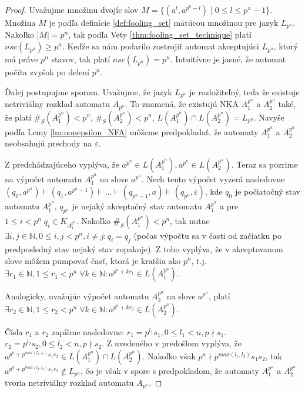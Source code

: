 \begin{proof}
Uvažujme množinu dvojíc slov $ M = \lbrace (a^{l},a^{p^n-l}) \; | \; 0 \leq l \leq p^n-1 \rbrace $. Množina $ M $ je podľa definície \ref{def:fooling_set} mätúcou množinou pre jazyk $ L_{p^n} $. Nakoľko $ |M|=p^n $, tak podľa Vety \ref{thm:fooling_set_technique} platí $ nsc(L_{p^n}) \geq p^n $. Keďže sa nám podarilo zostrojiť automat akceptujúci $ L_{p^n} $, ktorý má práve $ p^n $ stavov, tak platí $ nsc(L_{p^n}) = p^n$. Intuitívne je jasné, že automat počíta zvyšok po delení $ p^n $.
\par
Ďalej postupujme sporom. Uvažujme, že jazyk $ L_{p^n} $ je rozložiteľný, teda že existuje netriviálny rozklad automatu $ A_{p^n} $. To znamená, že existujú NKA $ A_1^{p^n} $ a $ A_2^{p^n} $ také, že platí $ \#_S(A_1^{p^n}) < p^n $, $ \#_S(A_2^{p^n}) < p^n $, $ L(A_1^{p^n}) \cap L(A_2^{p^n}) = L_{p^n} $. Navyše podľa Lemy \ref{lm:nonepsilon_NFA} môžeme predpokladať, že automaty $ A_1^{p^n}$ a $ A_2^{p^n} $ neobsahujú prechody na $ \varepsilon $. 
\par
Z predchádzajúceho vyplýva, že $ a^{p^n} \in L(A_1^{p^n}), a^{p^n} \in L(A_2^{p^n})$. Teraz sa pozrime na výpočet automatu $ A_1^{p^n} $ na slove $ a^{p^n} $. Nech tento výpočet vyzerá nasledovne $ (q_0,a^{p^n}) \vdash (q_1,a^{p^n-1}) \vdash \dots \vdash (q_{p^n-1},a) \vdash (q_{p^n},\varepsilon) $, kde $ q_0 $ je počiatočný stav automatu $ A_1^{p^n} $, $ q_{p^n} $ je nejaký akceptačný stav automatu $ A_1^{p^n} $ a pre $ 1 \leq i < p^n \; q_i \in K_{A_1^{p^n}}$. Nakoľko $ \#_S(A_1^{p^n}) < p^n $, tak nutne $ \exists i,j \in \mathbb{N}, 0 \leq i,j < p^n, i \neq j: q_i = q_j $ (počas výpočtu sa v časti od začiatku po predposledný stav nejaký stav zopakuje). Z toho vyplýva, že v akceptovanom slove môžem pumpovať časť, ktorá je kratšia ako $ p^n $, t.j. $ \exists r_1 \in \mathbb{N}, 1 \leq r_1 < p^n \; \forall k \in \mathbb{N}: a^{p^n+kr_1} \in L(A_1^{p^n})$. 
\par
Analogicky, uvažujúc výpočet automatu $ A_2^{p^n} $ na slove $ a^{p^n} $, platí $ \exists r_2 \in \mathbb{N}, 1 \leq r_2 < p^n \; \forall k \in \mathbb{N}: a^{p^n+kr_2} \in L(A_2^{p^n})$.
\par
Čísla $ r_1 $ a $ r_2 $ zapíšme nasledovne: $ r_1 = p^{l_1}s_1, 0 \leq l_1 < n, p \nmid s_1 $. $ r_2 = p^{l_2}s_2, 0 \leq l_2 < n, p \nmid s_2 $. Z uvedeného v predošlom vyplýva, že $ a^{p^n + p^{max(l_1,l_2)}s_1s_2} \in L(A_1^{p^n}) \cap L(A_2^{p^n}) $. Nakoľko však $ p^n \nmid p^{max(l_1,l_2)}s_1s_2$, tak $ a^{p^n + p^{max(l_1,l_2)}s_1s_2} \notin L_{p^n} $, čo je však v spore s predpokladom, že automaty $ A_1^{p^n} $ a $ A_2^{p^n} $ tvoria netriviálny rozklad automatu $ A_{p^n} $.
\end{proof}

